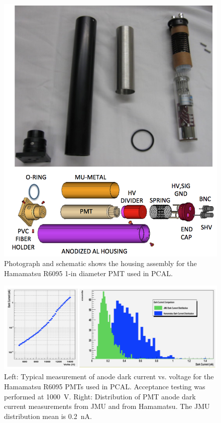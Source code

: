 \begin{figure}[hbt]
\centering
\includegraphics[width=0.85\columnwidth,keepaspectratio]{img/S4_PMT.png}
\caption{Photograph and schematic shows the housing assembly for the Hamamatsu R6095 1-in diameter PMT
  used in PCAL.}
\label{fig:S4_PMT}
\end{figure}

\begin{figure}[hbt]
\centering
\includegraphics[width=1.0\columnwidth,keepaspectratio]{img/S4_PMT_2.png}
\caption{Left: Typical measurement of anode dark current vs. voltage for the Hamamatsu R6095 PMTs used in
  PCAL. Acceptance testing was performed at 1000~V. Right: Distribution of PMT anode dark current
  measurements from JMU and from Hamamatsu. The JMU distribution mean is 0.2~nA.}
\label{fig:S4_PMT_2}
\end{figure}

